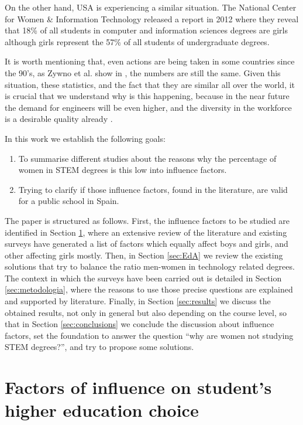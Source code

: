 \documentclass[journal,transmag]{IEEEtran}
\begin{document}
On the other hand, USA is experiencing a similar situation. The National Center for Women \& Information Technology released a report in 2012 \cite{NCWIT::stats} where they reveal that 18\% of all students in computer and information sciences degrees are girls although girls represent the 57\% of all students of undergraduate degrees.

It is worth mentioning that, even actions are being taken in some countries since the 90's, as Zywno et al. show in \cite{zywno1999attracting}, the numbers are still the same. Given this situation, these statistics, and the fact that they are similar all over the world, it is crucial that we understand why is this happening, because in the near future the demand for engineers will be even higher, and the diversity in the workforce is a desirable quality already \cite{wilson1992benefits}. 

In this work we establish the following goals:
\begin{enumerate}
	\item To summarise different studies about the reasons why the percentage of women in STEM degrees is this low into influence factors.
	\item Trying to clarify if those influence factors, found in the literature, are valid for a public school in Spain.
\end{enumerate}

The paper is structured as follows. First, the influence factors to be studied are identified in Section \ref{sec:factores}, where an extensive review of the literature and existing surveys have generated a list of factors which equally affect boys and girls, and other affecting girls mostly. Then, in Section \ref{sec:EdA} we review the existing solutions that try to balance the ratio men-women in technology related degrees. The context in which the surveys have been carried out is detailed in Section \ref{sec:metodologia}, where the reasons to use those precise questions are explained and supported by literature. Finally, in Section \ref{sec:results} we discuss the obtained results, not only in general but also depending on the course level, so that in Section \ref{sec:conclusions} we conclude the discussion about influence factors, set the foundation to answer the question ``why are women not studying STEM degrees?'', and try to propose some solutions.

\section{Factors of influence on student's higher education choice}
\label{sec:factores}
\end{document}
